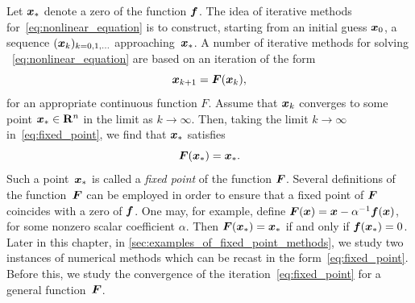Let $\mathbf{\boldsymbol{x}}_*$ denote a zero of the function $\mathbf{\boldsymbol{f}}$.
The idea of iterative methods for~\eqref{eq:nonlinear_equation} is to construct,
starting from an initial guess $\mathbf{\boldsymbol{x}}_0$,
a sequence $(\mathbf{\boldsymbol{x}}_k)_{k=0, 1, \dotsc}$ approaching~$\mathbf{\boldsymbol{x}}_*$.
A number of iterative methods for solving ~\eqref{eq:nonlinear_equation} are based on an iteration of the form
\begin{equation}
    \label{eq:fixed_point}
    \mathbf{\boldsymbol{x}}_{k+1} = \mathbf{\boldsymbol{F}}(\mathbf{\boldsymbol{x}}_{k}),
\end{equation}
for an appropriate continuous function $F$.
Assume that $\mathbf{\boldsymbol{x}}_k$ converges to some point $\mathbf{\boldsymbol{x}}_* \in \mathbf R^n$ in the limit as $k \to \infty$.
Then, taking the limit $k \to \infty$ in~\eqref{eq:fixed_point},
we find that $\mathbf{\boldsymbol{x}}_*$ satisfies
\[
    \mathbf{\boldsymbol{F}}(\mathbf{\boldsymbol{x}}_*) = \mathbf{\boldsymbol{x}}_*.
\]
Such a point~$\mathbf{\boldsymbol{x}}_*$ is called a \emph{fixed point} of the function $\mathbf{\boldsymbol{F}}$.
Several definitions of the function~$\mathbf{\boldsymbol{F}}$ can be employed in order to ensure that
a fixed point of $\mathbf{\boldsymbol{F}}$ coincides with a zero of $\mathbf{\boldsymbol{f}}$.
One may, for example, define $\mathbf{\boldsymbol{F}}(\mathbf{\boldsymbol{x}}) = \mathbf{\boldsymbol{x}} - \alpha^{-1} \mathbf{\boldsymbol{f}}(\mathbf{\boldsymbol{x}})$,
for some nonzero scalar coefficient $\alpha$.
Then $\mathbf{\boldsymbol{F}}(\mathbf{\boldsymbol{x}}_*) = \mathbf{\boldsymbol{x}}_*$ if and only if $\mathbf{\boldsymbol{f}}(\mathbf{\boldsymbol{x}}_*) = 0$.
Later in this chapter,
in \cref{sec:examples_of_fixed_point_methods},
we study two instances of numerical methods which can be recast in the form~\eqref{eq:fixed_point}.
Before this,
we study the convergence of the iteration~\eqref{eq:fixed_point} for a general function~$\mathbf{\boldsymbol{F}}$.

